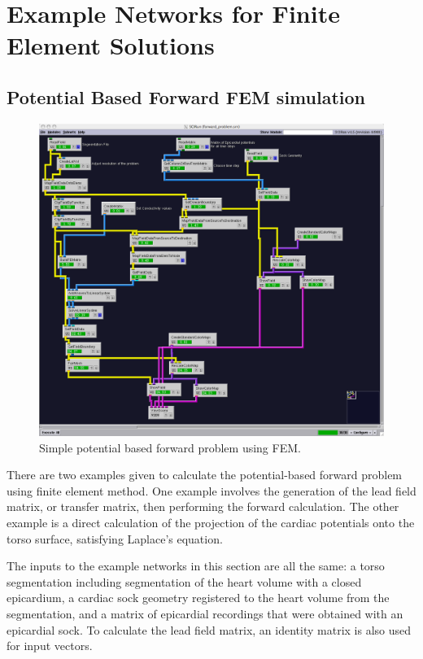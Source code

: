 \documentclass[fleqn,11pt,openany]{book}
\begin{document}
\section{Example Networks for Finite Element Solutions}

\subsection{Potential Based Forward FEM simulation}

\label{sec:pot_for_fem}
\begin{figure}[H]
\begin{center}
\includegraphics[trim = 5mm 0mm 50mm 0mm, clip, width=\textwidth]{ECGToolkitGuide_figures/potential_forward_fem.png}
\caption{Simple potential based forward problem using FEM.}
\label{fig:pot_for_fem}
\end{center}
\end{figure}

\newpage

There are two examples given to calculate the potential-based forward problem using finite element method. One example involves the generation of the lead field matrix, or transfer matrix, then performing the forward calculation. The other example is a direct calculation of the projection of the cardiac potentials onto the torso surface, satisfying Laplace's equation.


The inputs to the example networks in this section are all the same: a torso segmentation including segmentation of the heart volume with a closed epicardium, a cardiac sock geometry registered to the heart volume from the segmentation, and a matrix of epicardial recordings that were obtained with an epicardial sock. To calculate the lead field matrix, an identity matrix is also used for input vectors.
\end{document}
